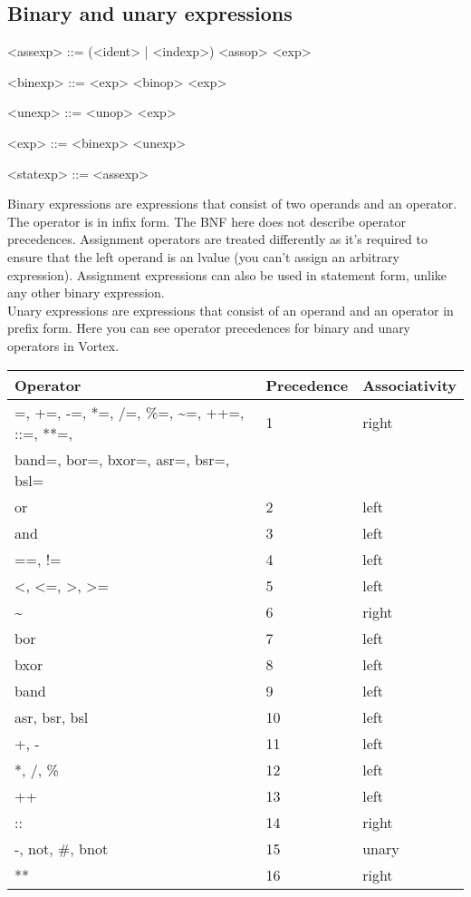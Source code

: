 \documentclass{article}
\newenvironment{bnf}
{
\begin{mdframed}
\begin{grammar}
}
{
\end{grammar}
\end{mdframed}
}
\begin{document}
\subsection{Binary and unary expressions}
\begin{bnf}
<assexp> ::= (<ident> | <indexp>) <assop> <exp>

<binexp> ::= <exp> <binop> <exp>

<unexp> ::= <unop> <exp>

<exp> ::= <binexp>
    \alt <unexp>

<statexp> ::= <assexp>
\end{bnf}
Binary expressions are expressions that consist of two operands and an
operator. The operator is in infix form. The BNF here does not describe
operator precedences. Assignment operators are treated differently as
it's required to ensure that the left operand is an lvalue (you can't
assign an arbitrary expression). Assignment expressions can also be used in
statement form, unlike any other binary expression.\\
Unary expressions are expressions that consist of an operand and an operator
in prefix form.
Here you can see operator precedences for binary and unary operators in Vortex.
\begin{center}
\begin{tabular}{| l | l | l |}
\hline
\textbf{Operator} & \textbf{Precedence} & \textbf{Associativity} \\ \hline
=, +=, -=, *=, /=, \%=, \~{}=, ++=, ::=, **=, & 1 & right \\
band=, bor=, bxor=, asr=, bsr=, bsl= & & \\ \hline
or & 2 & left \\ \hline
and & 3 & left \\ \hline
==, != & 4 & left \\ \hline
\textless, \textless=, \textgreater, \textgreater= & 5 & left \\ \hline
\~{} & 6 & right \\ \hline
bor & 7 & left \\ \hline
bxor & 8 & left \\ \hline
band & 9 & left \\ \hline
asr, bsr, bsl & 10 & left \\ \hline
+, - & 11 & left \\ \hline
*, /, \% & 12 & left \\ \hline
++ & 13 & left \\ \hline
:: & 14 & right \\ \hline
-, not, \#, bnot & 15 & unary \\ \hline
** & 16 & right \\ \hline
\end{tabular}
\end{center}
\end{document}
